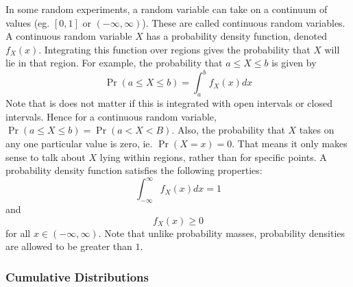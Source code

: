 \documentclass[11pt]{report} %
\begin{document}
In some random experiments, a random variable can take on a continuum of values (eg. $\left[0, 1\right]$ or $\left(-\infty, \infty\right)$). These are called continuous random variables. A continuous random variable $X$ has a probability density function, denoted $f_{X}\left(x\right)$. Integrating this function over regions gives the probability that $X$ will lie in that region. For example, the probability that $a \leq X \leq b$ is given by
\begin{equation}
\operatorname{Pr}\left(a \leq X \leq b\right) = \int_{a}^{b}f_{X}\left(x\right)dx
\end{equation}
Note that is does not matter if this is integrated with open intervals or closed intervals. Hence for a continuous random variable, $\operatorname{Pr}\left(a \leq X \leq b\right) = \operatorname{Pr}\left(a < X < B\right)$. Also, the probability that $X$ takes on any one particular value is zero, ie. $\operatorname{Pr}\left(X = x\right) = 0$. That means it only makes sense to talk about $X$ lying within regions, rather than for specific points. A probability density function satisfies the following properties:
\begin{equation}
\int_{-\infty}^{\infty}f_{X}\left(x\right)dx = 1
\end{equation}
and
\begin{equation}
f_{X}\left(x\right) \geq 0
\end{equation}
for all $x\in\left(-\infty, \infty\right)$. Note that unlike probability masses, probability densities are allowed to be greater than $1$.

\subsubsection{Cumulative Distributions}
\end{document}
